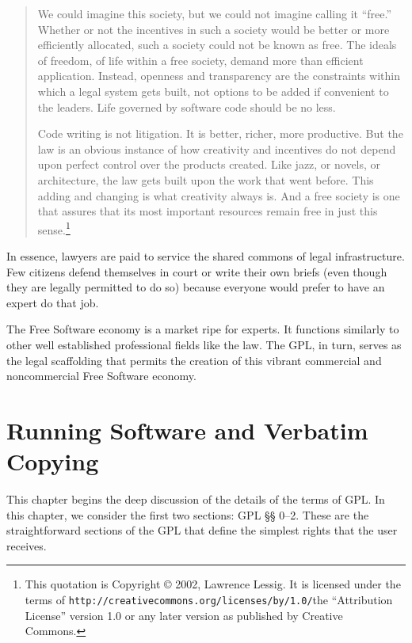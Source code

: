 \documentclass[11pt, letterpaper]{book}
\begin{document}
\begin{quotation}
We could imagine this society, but we could not imagine calling it
``free.''  Whether or not the incentives in such a society would be better
or more efficiently allocated, such a society could not be known as free.
The ideals of freedom, of life within a free society, demand more than
efficient application. Instead, openness and transparency are the
constraints within which a legal system gets built, not options to be
added if convenient to the leaders. Life governed by software code should
be no less.

Code writing is not litigation. It is better, richer, more
productive. But the law is an obvious instance of how creativity and
incentives do not depend upon perfect control over the products
created. Like jazz, or novels, or architecture, the law gets built
upon the work that went before. This adding and changing is what
creativity always is. And a free society is one that assures that its
most important resources remain free in just this sense.\footnote{This
quotation is Copyright \copyright{} 2002, Lawrence Lessig. It is
licensed under the terms of
\texttt{http://creativecommons.org/licenses/by/1.0/}{the ``Attribution
License'' version 1.0} or any later version as published by Creative
Commons.}
\end{quotation}

In essence, lawyers are paid to service the shared commons of legal
infrastructure. Few citizens defend themselves in court or write their
own briefs (even though they are legally permitted to do so) because
everyone would prefer to have an expert do that job.

The Free Software economy is a market ripe for experts. It
functions similarly to other well established professional fields like the
law. The GPL, in turn, serves as the legal scaffolding that permits the
creation of this vibrant commercial and noncommercial Free Software
economy.

\chapter{Running Software and Verbatim Copying}
\label{run-and-verbatim}


This chapter begins the deep discussion of the details of the terms of
GPL\@. In this chapter, we consider the first two sections: GPL \S\S
0--2. These are the straightforward sections of the GPL that define the
simplest rights that the user receives.
\end{document}
